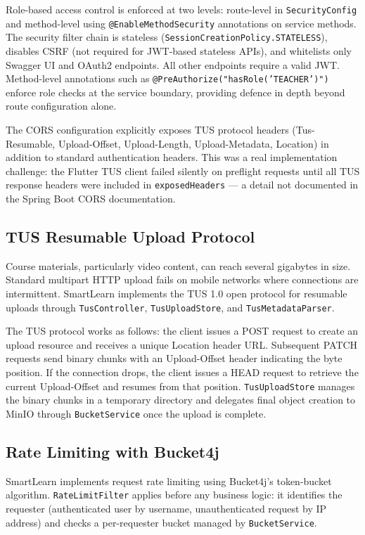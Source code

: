\documentclass[12pt,a4paper]{report}
\begin{document}
Role-based access control is enforced at two levels: route-level in \texttt{SecurityConfig}
and method-level using \texttt{@EnableMethodSecurity} annotations on service methods. The
security filter chain is stateless (\texttt{SessionCreationPolicy.STATELESS}), disables
CSRF (not required for JWT-based stateless APIs), and whitelists only Swagger UI and OAuth2
endpoints. All other endpoints require a valid JWT. Method-level annotations such as
\texttt{@PreAuthorize("hasRole('TEACHER')")} enforce role checks at the service boundary,
providing defence in depth beyond route configuration alone.

The CORS configuration explicitly exposes TUS protocol headers (Tus-Resumable,
Upload-Offset, Upload-Length, Upload-Metadata, Location) in addition to standard
authentication headers. This was a real implementation challenge: the Flutter TUS client
failed silently on preflight requests until all TUS response headers were included in
\texttt{exposedHeaders} --- a detail not documented in the Spring Boot CORS documentation.

\subsection{TUS Resumable Upload Protocol}

Course materials, particularly video content, can reach several gigabytes in size.
Standard multipart HTTP upload fails on mobile networks where connections are intermittent.
SmartLearn implements the TUS 1.0 open protocol for resumable uploads through
\texttt{TusController}, \texttt{TusUploadStore}, and \texttt{TusMetadataParser}.

The TUS protocol works as follows: the client issues a POST request to create an upload
resource and receives a unique Location header URL. Subsequent PATCH requests send binary
chunks with an Upload-Offset header indicating the byte position. If the connection drops,
the client issues a HEAD request to retrieve the current Upload-Offset and resumes from
that position. \texttt{TusUploadStore} manages the binary chunks in a temporary directory
and delegates final object creation to MinIO through \texttt{BucketService} once the upload
is complete.

\subsection{Rate Limiting with Bucket4j}

SmartLearn implements request rate limiting using Bucket4j's token-bucket algorithm.
\texttt{RateLimitFilter} applies before any business logic: it identifies the requester
(authenticated user by username, unauthenticated request by IP address) and checks a
per-requester bucket managed by \texttt{BucketService}.
\end{document}
